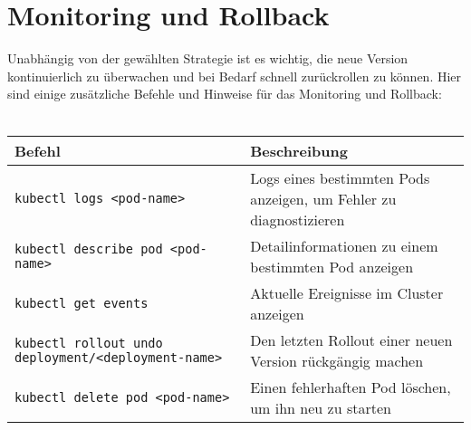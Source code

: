 \section{Monitoring und Rollback}
Unabhängig von der gewählten Strategie ist es wichtig, die neue Version kontinuierlich zu überwachen und bei Bedarf schnell zurückrollen zu können. Hier sind einige zusätzliche Befehle und Hinweise für das Monitoring und Rollback:\\
\phantom{.}\\
\begin{tabular}{|p{}|p{}|}
\hline
\textbf{Befehl} & \textbf{Beschreibung} \\
\hline
\texttt{kubectl logs <pod-name>} & Logs eines bestimmten Pods anzeigen, um Fehler zu diagnostizieren \\
\texttt{kubectl describe pod <pod-name>} & Detailinformationen zu einem bestimmten Pod anzeigen \\
\texttt{kubectl get events} & Aktuelle Ereignisse im Cluster anzeigen \\
\texttt{kubectl rollout undo deployment/<deployment-name>} & Den letzten Rollout einer neuen Version rückgängig machen \\
\texttt{kubectl delete pod <pod-name>} & Einen fehlerhaften Pod löschen, um ihn neu zu starten \\
\hline
\end{tabular}